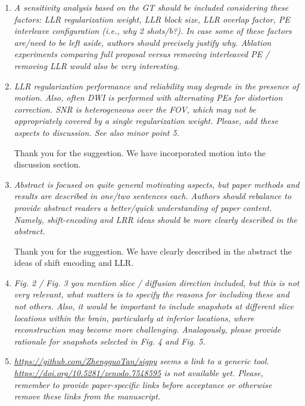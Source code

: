 \documentclass[a4paper,11pt,twoside]{report}
\begin{document}
\begin{enumerate}
    \item \textit{A sensitivity analysis based on the GT should be included considering these factors: LLR regularization weight, LLR block size, LLR overlap factor, PE interleave configuration (i.e., why 2 shots/b?). In case some of these factors are/need to be left aside, authors should precisely justify why. Ablation experiments comparing full proposal versus removing interleaved PE / removing LLR would also be very interesting.}
    \item \textit{LLR regularization performance and reliability may degrade in the presence of motion. Also, often DWI is performed with alternating PEs for distortion correction. SNR is heterogeneous over the FOV, which may not be appropriately covered by a single regularization weight. Please, add these aspects to discussion. See also minor point 5.}

    \hspace{1em} Thank you for the suggestion.
    We have incorporated motion into the discussion section.

    \item \textit{Abstract is focused on quite general motivating aspects, but paper methods and results are described in one/two sentences each. Authors should rebalance to provide abstract readers a better/quick understanding of paper content. Namely, shift-encoding and LRR ideas should be more clearly described in the abstract.}

    \hspace{1em} Thank you for the suggestion. We have clearly described
    in the abstract the ideas of shift encoding and LLR.

    \item \textit{Fig. 2 / Fig. 3 \textrightarrow you mention slice / diffusion direction included, but this is not very relevant, what matters is to specify the reasons for including these and not others. Also, it would be important to include snapshots at different slice locations within the brain, particularly at inferior locations, where reconstruction may become more challenging. Analogously, please provide rationale for snapshots selected in Fig. 4 and Fig. 5.}

    \item \textit{\url{https://github.com/ZhengguoTan/sigpy} seems a link to a generic tool. \url{https://doi.org/10.5281/zenodo.7548595} is not available yet. Please, remember to provide paper-specific links before acceptance or otherwise remove these links from the manuscript.}


\end{enumerate}
\end{document}

